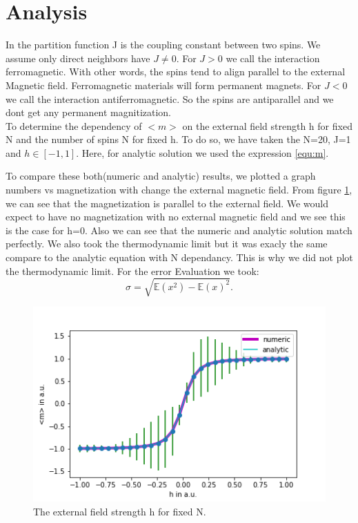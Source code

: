 \documentclass[11pt, a4paper, DIV=12]{scrartcl}
\begin{document}
\section{Analysis}
In the partition function J is the coupling constant between two spins. We assume only direct neighbors have $J\neq 0$. For $J>0$ we call the interaction ferromagnetic. With other words, the spins tend to align parallel to the external Magnetic field. Ferromagnetic materials will form permanent magnets. For $J<0$ we call the interaction antiferromagnetic. So the spins are antiparallel and we dont get any permanent magnitization.\\

To determine the dependency of $ <m> $ on the external field strength h for fixed N and the number of spins N for fixed h. To do so, we have taken the N=20, J=1 and $h \in [-1, 1]$. Here, for analytic solution we used the expression \ref{equ:m}.

To compare these both(numeric and analytic) results, we plotted a graph numbers vs magnetization with change the external magnetic field. From figure \ref{fig:Nconst}, we can see that the magnetization is parallel to the external field. We would expect to have no magnetization with no external magnetic field and we see this is the case for h=0. Also we can see that the numeric and analytic solution match perfectly. We also took the thermodynamic limit but it was exacly the same compare to the analytic equation with N dependancy. This is why we did not plot the thermodynamic limit. For the error Evaluation we took:
\begin{equation}
	\sigma=\sqrt{\mathbb{E}(x^2)-\mathbb{E}(x)^2}\text{.}
\end{equation}
\begin{figure}[H]
	\centering
	\includegraphics[width=0.8\linewidth]{Nconst.png}
	\caption{The external field strength h for fixed N.}
	\label{fig:Nconst}
\end{figure}
\end{document}
